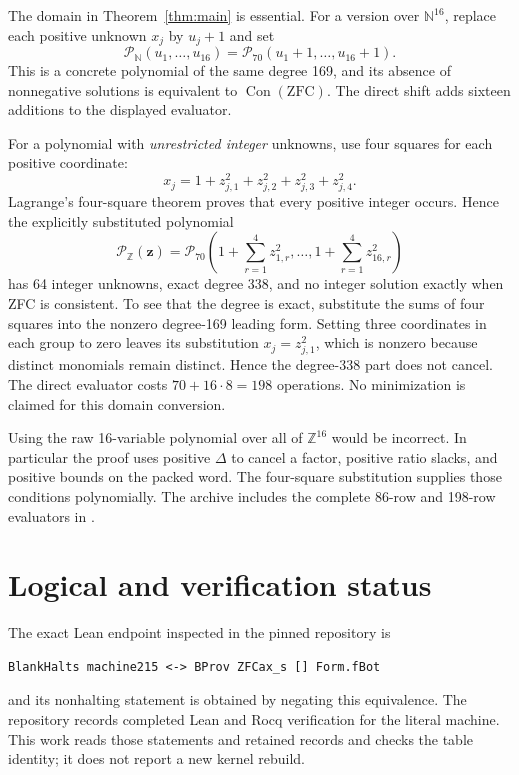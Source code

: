 \documentclass[11pt]{article}
\theoremstyle{definition}
\newcommand{\N}{\mathbb N}
\newcommand{\Z}{\mathbb Z}
\newcommand{\Con}{\operatorname{Con}}
\newcommand{\norms}{\mathcal P}
\begin{document}
The domain in Theorem~\ref{thm:main} is essential. For a version over
$\N^{16}$, replace each positive unknown $x_j$ by $u_j+1$ and set
\[
 \norms_{\N}(u_1,\ldots,u_{16})
 =\norms_{70}(u_1+1,\ldots,u_{16}+1).
\]
This is a concrete polynomial of the same degree 169, and its absence of
nonnegative solutions is equivalent to $\Con(\mathrm{ZFC})$. The direct
shift adds sixteen additions to the displayed evaluator.

For a polynomial with \emph{unrestricted integer} unknowns, use four
squares for each positive coordinate:
\[
 x_j=1+z_{j,1}^2+z_{j,2}^2+z_{j,3}^2+z_{j,4}^2.
\]
Lagrange's four-square theorem proves that every positive integer occurs.
Hence the explicitly substituted polynomial
\begin{equation}\label{eq:integer-polynomial}
 \norms_{\Z}(\mathbf z)
 =\norms_{70}\left(
 1+\sum_{r=1}^4z_{1,r}^2,\ldots,
 1+\sum_{r=1}^4z_{16,r}^2\right)
\end{equation}
has 64 integer unknowns, exact degree 338, and no integer solution exactly
when ZFC is consistent. To see that the degree is exact, substitute the
sums of four squares into the nonzero degree-169 leading form. Setting
three coordinates in each group to zero leaves its substitution
$x_j=z_{j,1}^2$, which is nonzero because distinct monomials remain
distinct. Hence the degree-338 part does not cancel. The direct evaluator costs $70+16\cdot8=198$
operations. No minimization is claimed for this domain conversion.

Using the raw 16-variable polynomial over all of $\Z^{16}$ would be
incorrect. In particular the proof uses positive $\Delta$ to cancel a
factor, positive ratio slacks, and positive bounds on the packed word.
The four-square substitution supplies those conditions polynomially.
The archive includes the complete 86-row and 198-row evaluators in
.

\section{Logical and verification status}
\label{sec:logical-status}

The exact Lean endpoint inspected in the pinned repository is
\begin{lstlisting}
BlankHalts machine215 <-> BProv ZFCax_s [] Form.fBot
\end{lstlisting}
and its nonhalting statement is obtained by negating this equivalence.
The repository records completed Lean and Rocq verification for the literal
machine. This work reads those statements and retained records and checks
the table identity; it does not report a new kernel rebuild.
\end{document}
